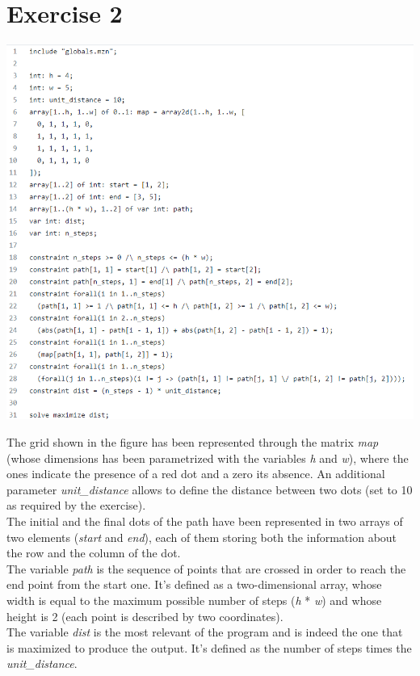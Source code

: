 \documentclass{article}
\begin{document}
\section{Exercise 2}
\vspace{0.2cm}
\includegraphics[width=\linewidth]{img/Es2.png}
\vspace{0.2cm}

The grid shown in the figure has been represented through the matrix \textit{map} (whose dimensions has been parametrized
with the variables \textit{h} and \textit{w}), where the ones indicate the presence of a red dot and a zero its
absence. An additional parameter \textit{unit\_distance} allows to define the distance between two dots 
(set to 10 as required by the exercise).\\
The initial and the final dots of the path have been represented in two arrays of two elements (\textit{start} and \textit{end}), 
each of them storing both the information about the row and the column of the dot.\\
The variable \textit{path} is the sequence of points that are crossed in order to reach the end point from
the start one. It's defined as a two-dimensional array, whose width is equal to the maximum possible number of steps (\textit{h} * \textit{w}) 
and whose height is 2 (each point is described by two coordinates).\\
The variable \textit{dist} is the most relevant of the program and is indeed the one that is maximized to produce the output.
It's defined as the number of steps times the \textit{unit\_distance}.
\end{document}
